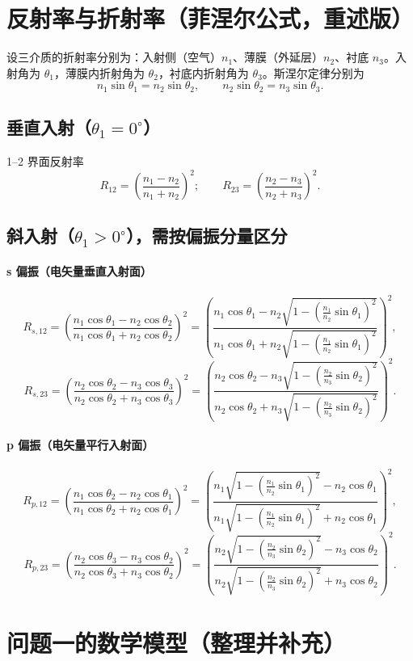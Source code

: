 \documentclass{ctexart}
\begin{document}
\section{反射率与折射率（菲涅尔公式，重述版）}
设三介质的折射率分别为：入射侧（空气）\(n_1\)、薄膜（外延层）\(n_2\)、衬底 \(n_3\)。入射角为 \(\theta_1\)，薄膜内折射角为 \(\theta_2\)，衬底内折射角为 \(\theta_3\)。斯涅尔定律分别为
\[
    n_1\sin\theta_1=n_2\sin\theta_2,\qquad n_2\sin\theta_2=n_3\sin\theta_3.
\]
\subsection{垂直入射（\(\theta_1=0^\circ\)）}
1--2 界面反射率
\[
    R_{12}=\left(\frac{n_1-n_2}{n_1+n_2}\right)^2;\qquad
    R_{23}=\left(\frac{n_2-n_3}{n_2+n_3}\right)^2.
\]
\subsection{斜入射（\(\theta_1>0^\circ\)），需按偏振分量区分}
\paragraph{s 偏振（电矢量垂直入射面）}
\[
    R_{s,12}=\left(\frac{n_1\cos\theta_1 - n_2\cos\theta_2}{n_1\cos\theta_1 + n_2\cos\theta_2}\right)^2
    =\left(\frac{n_1\cos\theta_1 - n_2\sqrt{1-(\tfrac{n_1}{n_2}\sin\theta_1)^2}}{n_1\cos\theta_1 + n_2\sqrt{1-(\tfrac{n_1}{n_2}\sin\theta_1)^2}}\right)^2,
\]
\[
    R_{s,23}=\left(\frac{n_2\cos\theta_2 - n_3\cos\theta_3}{n_2\cos\theta_2 + n_3\cos\theta_3}\right)^2
    =\left(\frac{n_2\cos\theta_2 - n_3\sqrt{1-(\tfrac{n_2}{n_3}\sin\theta_2)^2}}{n_2\cos\theta_2 + n_3\sqrt{1-(\tfrac{n_2}{n_3}\sin\theta_2)^2}}\right)^2.
\]
\paragraph{p 偏振（电矢量平行入射面）}
\[
    R_{p,12}=\left(\frac{n_1\cos\theta_2 - n_2\cos\theta_1}{n_1\cos\theta_2 + n_2\cos\theta_1}\right)^2
    =\left(\frac{n_1\sqrt{1-(\tfrac{n_1}{n_2}\sin\theta_1)^2} - n_2\cos\theta_1}{n_1\sqrt{1-(\tfrac{n_1}{n_2}\sin\theta_1)^2} + n_2\cos\theta_1}\right)^2,
\]
\[
    R_{p,23}=\left(\frac{n_2\cos\theta_3 - n_3\cos\theta_2}{n_2\cos\theta_3 + n_3\cos\theta_2}\right)^2
    =\left(\frac{n_2\sqrt{1-(\tfrac{n_2}{n_3}\sin\theta_2)^2} - n_3\cos\theta_2}{n_2\sqrt{1-(\tfrac{n_2}{n_3}\sin\theta_2)^2} + n_3\cos\theta_2}\right)^2.
\]

\section{问题一的数学模型（整理并补充）}
\end{document}
